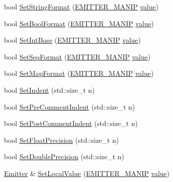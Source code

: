 \begin{DoxyCompactItemize}
\item 
bool \mbox{\hyperlink{class_y_a_m_l_1_1_emitter_a66b7579e5e295563e4d79cd204cd5f33}{Set\+String\+Format}} (\mbox{\hyperlink{namespace_y_a_m_l_a67c320aa50d3de7ecba1d0b8775dd684}{E\+M\+I\+T\+T\+E\+R\+\_\+\+M\+A\+N\+IP}} \mbox{\hyperlink{glad_8h_a03aff08f73d7fde3d1a08e0abd8e84fa}{value}})
\item 
bool \mbox{\hyperlink{class_y_a_m_l_1_1_emitter_a4331fa65c6203a92a32b150cc589e314}{Set\+Bool\+Format}} (\mbox{\hyperlink{namespace_y_a_m_l_a67c320aa50d3de7ecba1d0b8775dd684}{E\+M\+I\+T\+T\+E\+R\+\_\+\+M\+A\+N\+IP}} \mbox{\hyperlink{glad_8h_a03aff08f73d7fde3d1a08e0abd8e84fa}{value}})
\item 
bool \mbox{\hyperlink{class_y_a_m_l_1_1_emitter_ab34a0f55fbb4ec5c6a26147bd50185f2}{Set\+Int\+Base}} (\mbox{\hyperlink{namespace_y_a_m_l_a67c320aa50d3de7ecba1d0b8775dd684}{E\+M\+I\+T\+T\+E\+R\+\_\+\+M\+A\+N\+IP}} \mbox{\hyperlink{glad_8h_a03aff08f73d7fde3d1a08e0abd8e84fa}{value}})
\item 
bool \mbox{\hyperlink{class_y_a_m_l_1_1_emitter_afe76d23677bc181c7d6efdfd4e599fb9}{Set\+Seq\+Format}} (\mbox{\hyperlink{namespace_y_a_m_l_a67c320aa50d3de7ecba1d0b8775dd684}{E\+M\+I\+T\+T\+E\+R\+\_\+\+M\+A\+N\+IP}} \mbox{\hyperlink{glad_8h_a03aff08f73d7fde3d1a08e0abd8e84fa}{value}})
\item 
bool \mbox{\hyperlink{class_y_a_m_l_1_1_emitter_af4f0a74c02218e9ac13bf42ecdfa163d}{Set\+Map\+Format}} (\mbox{\hyperlink{namespace_y_a_m_l_a67c320aa50d3de7ecba1d0b8775dd684}{E\+M\+I\+T\+T\+E\+R\+\_\+\+M\+A\+N\+IP}} \mbox{\hyperlink{glad_8h_a03aff08f73d7fde3d1a08e0abd8e84fa}{value}})
\item 
bool \mbox{\hyperlink{class_y_a_m_l_1_1_emitter_a2bc91da6af786e34990c3bb9abdc0a49}{Set\+Indent}} (std\+::size\+\_\+t n)
\item 
bool \mbox{\hyperlink{class_y_a_m_l_1_1_emitter_abab90095e9323d61ee938cf5d1d03da4}{Set\+Pre\+Comment\+Indent}} (std\+::size\+\_\+t n)
\item 
bool \mbox{\hyperlink{class_y_a_m_l_1_1_emitter_a86ffdb112eb1d93e51adcf2700d576e4}{Set\+Post\+Comment\+Indent}} (std\+::size\+\_\+t n)
\item 
bool \mbox{\hyperlink{class_y_a_m_l_1_1_emitter_a19c881b4f5725b35e1ea97d37fe55c7f}{Set\+Float\+Precision}} (std\+::size\+\_\+t n)
\item 
bool \mbox{\hyperlink{class_y_a_m_l_1_1_emitter_ab41766682ab7c2502ba6e74389f33bfa}{Set\+Double\+Precision}} (std\+::size\+\_\+t n)
\item 
\mbox{\hyperlink{class_y_a_m_l_1_1_emitter}{Emitter}} \& \mbox{\hyperlink{class_y_a_m_l_1_1_emitter_adf24e3def57bce054b5a18aaef0ebd4d}{Set\+Local\+Value}} (\mbox{\hyperlink{namespace_y_a_m_l_a67c320aa50d3de7ecba1d0b8775dd684}{E\+M\+I\+T\+T\+E\+R\+\_\+\+M\+A\+N\+IP}} \mbox{\hyperlink{glad_8h_a03aff08f73d7fde3d1a08e0abd8e84fa}{value}})

\end{DoxyCompactItemize}
